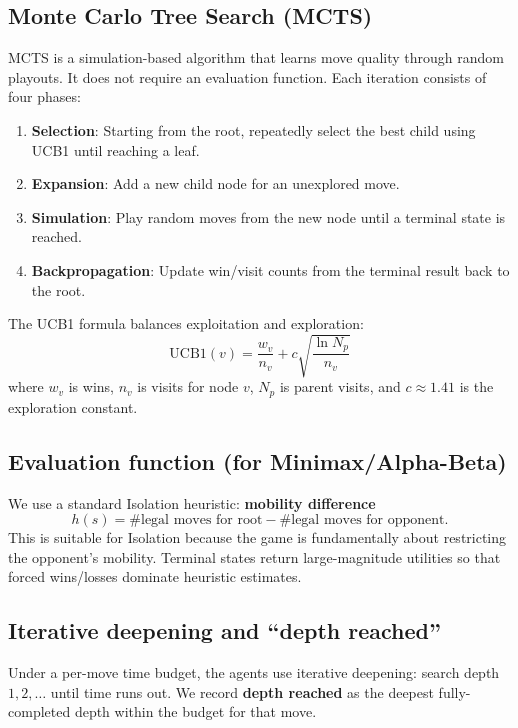\documentclass[11pt]{article}
\begin{document}
\subsection{Monte Carlo Tree Search (MCTS)}
MCTS is a simulation-based algorithm that learns move quality through random playouts. It does not require
an evaluation function. Each iteration consists of four phases:

\begin{enumerate}
  \item \textbf{Selection}: Starting from the root, repeatedly select the best child using UCB1 until reaching a leaf.
  \item \textbf{Expansion}: Add a new child node for an unexplored move.
  \item \textbf{Simulation}: Play random moves from the new node until a terminal state is reached.
  \item \textbf{Backpropagation}: Update win/visit counts from the terminal result back to the root.
\end{enumerate}

The UCB1 formula balances exploitation and exploration:
\[
\text{UCB1}(v) = \frac{w_v}{n_v} + c \sqrt{\frac{\ln N_p}{n_v}}
\]
where \(w_v\) is wins, \(n_v\) is visits for node \(v\), \(N_p\) is parent visits, and \(c \approx 1.41\) is the exploration constant.

\subsection{Evaluation function (for Minimax/Alpha-Beta)}
We use a standard Isolation heuristic: \textbf{mobility difference}
\[
h(s) = \#\text{legal moves for root} - \#\text{legal moves for opponent}.
\]
This is suitable for Isolation because the game is fundamentally about restricting the opponent's mobility.
Terminal states return large-magnitude utilities so that forced wins/losses dominate heuristic estimates.

\subsection{Iterative deepening and ``depth reached''}
Under a per-move time budget, the agents use iterative deepening: search depth \(1,2,\dots\) until time runs out.
We record \textbf{depth reached} as the deepest fully-completed depth within the budget for that move.
\end{document}
